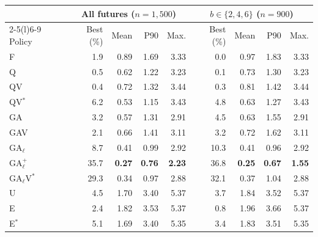 \begin{tabular}{@{}lrrrrrrrr@{}}
\toprule
 & \multicolumn{4}{c}{All futures ($n=1,500$)} & \multicolumn{4}{c}{$b\in\{2,4,6\}$ ($n=900$)} \\
\cmidrule(lr){2-5}\cmidrule(l){6-9}
Policy & Best (\%) & Mean & P90 & Max. & Best (\%) & Mean & P90 & Max. \\
\midrule
F & 1.9 & 0.89 & 1.69 & 3.33 & 0.0 & 0.97 & 1.83 & 3.33 \\
Q & 0.5 & 0.62 & 1.22 & 3.23 & 0.1 & 0.73 & 1.30 & 3.23 \\
QV & 0.4 & 0.72 & 1.32 & 3.44 & 0.3 & 0.81 & 1.42 & 3.44 \\
QV$^{*}$ & 6.2 & 0.53 & 1.15 & 3.43 & 4.8 & 0.63 & 1.27 & 3.43 \\
GA & 3.2 & 0.57 & 1.31 & 2.91 & 4.5 & 0.63 & 1.55 & 2.91 \\
GAV & 2.1 & 0.66 & 1.41 & 3.11 & 3.2 & 0.72 & 1.62 & 3.11 \\
GA$_\ell$ & 8.7 & 0.41 & 0.99 & 2.92 & 10.3 & 0.41 & 0.96 & 2.92 \\
GA$_\ell^{+}$ & 35.7 & \textbf{0.27} & \textbf{0.76} & \textbf{2.23} & 36.8 & \textbf{0.25} & \textbf{0.67} & \textbf{1.55} \\
GA$_\ell$V$^{*}$ & 29.3 & 0.34 & 0.97 & 2.88 & 32.1 & 0.37 & 1.04 & 2.88 \\
U & 4.5 & 1.70 & 3.40 & 5.37 & 3.7 & 1.84 & 3.52 & 5.37 \\
E & 2.4 & 1.82 & 3.53 & 5.37 & 0.8 & 1.96 & 3.66 & 5.37 \\
E$^{*}$ & 5.1 & 1.69 & 3.40 & 5.35 & 3.4 & 1.83 & 3.51 & 5.35 \\
\bottomrule
\end{tabular}